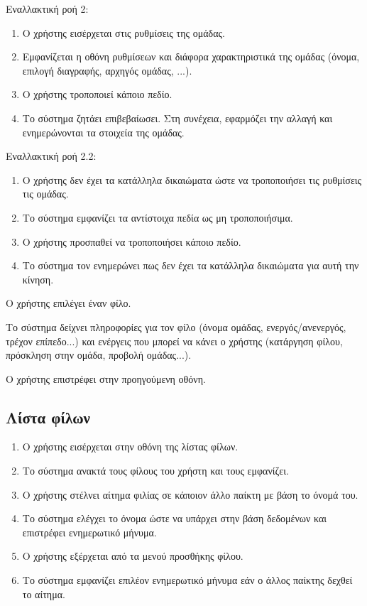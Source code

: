 Εναλλακτική ροή 2:
\begin{enumerate}[label=3.\alph*.,ref=3.\alph*]
\item Ο χρήστης εισέρχεται στις ρυθμίσεις της ομάδας.
\item Εμφανίζεται η οθόνη ρυθμίσεων και διάφορα χαρακτηριστικά της ομάδας (όνομα, επιλογή διαγραφής, αρχηγός ομάδας, ...).
\item Ο χρήστης τροποποιεί κάποιο πεδίο.
\item Το σύστημα ζητάει επιβεβαίωσει. Στη συνέχεια, εφαρμόζει την αλλαγή και ενημερώνονται τα στοιχεία της ομάδας.
\end{enumerate}

Εναλλακτική ροή 2.2:
\begin{enumerate}[label=3.3.\alph*.,ref=3.3.\alph*]
\item Ο χρήστης δεν έχει τα κατάλληλα δικαιώματα ώστε να τροποποιήσει τις ρυθμίσεις τις ομάδας.
\item Το σύστημα εμφανίζει τα αντίστοιχα πεδία ως μη τροποποιήσιμα.
\item Ο χρήστης προσπαθεί να τροποποιήσει κάποιο πεδίο.
\item Το σύστημα τον ενημερώνει πως δεν έχει τα κατάλληλα δικαιώματα για αυτή την κίνηση.
\end{enumerate}


\item Ο χρήστης επιλέγει έναν φίλο.
\item Το σύστημα δείχνει πληροφορίες για τον φίλο (όνομα ομάδας, ενεργός/ανενεργός, τρέχον επίπεδο...) και ενέργεις που μπορεί να κάνει ο χρήστης (κατάργηση φίλου, πρόσκληση στην ομάδα, προβολή ομάδας...).
\item Ο χρήστης επιστρέφει στην προηγούμενη οθόνη.


\newpage
\subsection{Λίστα φίλων}
\label{sec:friendslist}
\begin{enumerate}
\item Ο χρήστης εισέρχεται στην οθόνη της λίστας φίλων.
\item Το σύστημα ανακτά τους φίλους του χρήστη και τους εμφανίζει.
\item Ο χρήστης στέλνει αίτημα φιλίας σε κάποιον άλλο παίκτη με βάση το όνομά του.
\item Το σύστημα ελέγχει το όνομα ώστε να υπάρχει στην βάση δεδομένων και επιστρέφει ενημερωτικό μήνυμα.
\item Ο χρήστης εξέρχεται από τα μενού προσθήκης φίλου.
\item Το σύστημα εμφανίζει επιλέον ενημερωτικό μήνυμα εάν ο άλλος παίκτης δεχθεί το αίτημα.
\end{enumerate}

